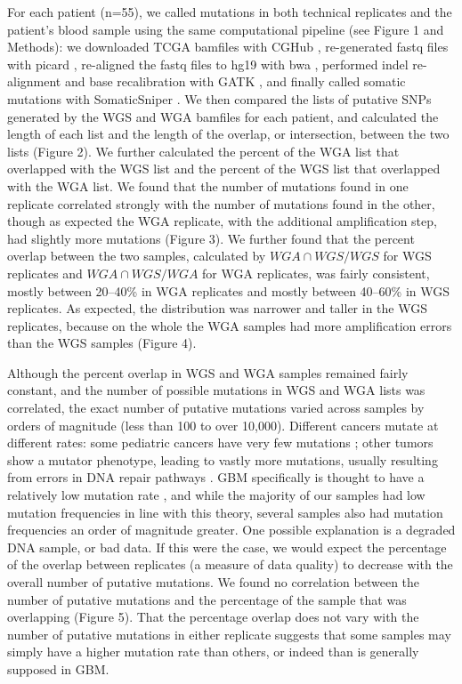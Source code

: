 \documentclass[11pt]{article} %
\begin{document}
For each patient (n=55), we called mutations in both technical replicates and the patient's blood sample using the same computational pipeline (see Figure 1 and Methods): we downloaded TCGA bamfiles with CGHub \citep{CGHub}, re-generated fastq files with picard \citep{picard}, re-aligned the fastq files to hg19 with bwa \citep{bwa}, performed indel re-alignment and base recalibration with GATK \citep{GATK}, and finally called somatic mutations with SomaticSniper \citep{SomaticSniper}. We then compared the lists of putative SNPs generated by the WGS and WGA bamfiles for each patient, and calculated the length of each list and the length of the overlap, or intersection, between the two lists (Figure 2). We further calculated the percent of the WGA list that overlapped with the WGS list and the percent of the WGS list that overlapped with the WGA list. We found that the number of mutations found in one replicate correlated strongly with the number of mutations found in the other, though as expected the WGA replicate, with the additional amplification step, had slightly more mutations (Figure 3). We further found that the percent overlap between the two samples, calculated by $WGA \cap WGS/WGS$ for WGS replicates and $WGA \cap WGS/WGA$ for WGA replicates, was fairly consistent, mostly between 20--40\% in WGA replicates and mostly between 40--60\% in WGS replicates. As expected, the distribution was narrower and taller in the WGS replicates, because on the whole the WGA samples had more amplification errors than the WGS samples (Figure 4).

Although the percent overlap in WGS and WGA samples remained fairly constant, and the number of possible mutations in WGS and WGA lists was correlated, the exact number of putative mutations varied across samples by orders of magnitude (less than 100 to over 10,000). Different cancers mutate at different rates: some pediatric cancers have very few mutations \citep{RB2hit, pediatric}; other tumors show a mutator phenotype, leading to vastly more mutations, usually resulting from errors in DNA repair pathways \citep{mutator}. GBM specifically is thought to have a relatively low mutation rate \citep{Parsons, TCGA-GBM-13}, and while the majority of our samples had low mutation frequencies in line with this theory, several samples also had mutation frequencies an order of magnitude greater. One possible explanation is a degraded DNA sample, or bad data. If this were the case, we would expect the percentage of the overlap between replicates (a measure of data quality) to decrease with the overall number of putative mutations. We found no correlation between the number of putative mutations and the percentage of the sample that was overlapping (Figure 5). That the percentage overlap does not vary with the number of putative mutations in either replicate suggests that some samples may simply have a higher mutation rate than others, or indeed than is generally supposed in GBM.
\end{document}
